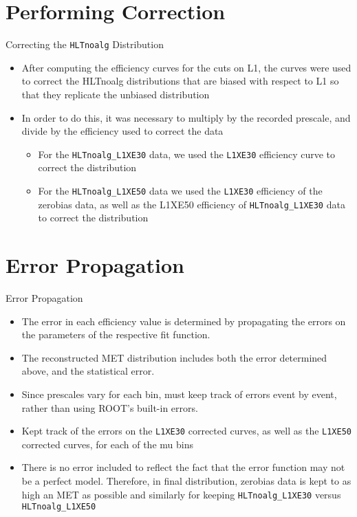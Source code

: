 \documentclass[]{beamer}
\begin{document}
\section{Performing Correction}
\begin{frame}{Correcting the \texttt{HLTnoalg} Distribution}
		\begin{itemize}
				\item After computing the efficiency curves for the cuts on L1, the curves were used to correct the HLTnoalg distributions that are biased with respect to L1 so that they replicate the unbiased distribution
				\item In order to do this, it was necessary to multiply by the recorded prescale, and divide by the efficiency used to correct the data
				\begin{itemize}
						\item For the \texttt{HLTnoalg\_L1XE30} data, we used the \texttt{L1XE30} efficiency curve to correct the distribution
						\item For the \texttt{HLTnoalg\_L1XE50} data we used the \texttt{L1XE30} efficiency of the zerobias data, as well as the L1XE50 efficiency of \texttt{HLTnoalg\_L1XE30} data to correct the distribution
				\end{itemize}
		\end{itemize}
\end{frame}
\section{Error Propagation}
\begin{frame}{Error Propagation}
		\begin{itemize}
				\item The error in each efficiency value is determined by propagating the errors on the parameters of the respective fit function.
				\item The reconstructed MET distribution includes both the error determined above, and the statistical error. 
				\item Since prescales vary for each bin, must keep track of errors event by event, rather than using ROOT’s built-in errors. 
				\item Kept track of the errors on the \texttt{L1XE30} corrected curves, as well as the \texttt{L1XE50} corrected curves, for each of the mu bins
                \item There is no error included to reflect the fact that the error function may not be a perfect model. Therefore, in final distribution, zerobias data is kept to as high an MET as possible and similarly for keeping \texttt{HLTnoalg\_L1XE30} versus \texttt{HLTnoalg\_L1XE50}
        \end{itemize}
\end{frame}
\begin{frame}
\end{frame}
\begin{frame}
\end{frame}
\end{document}
